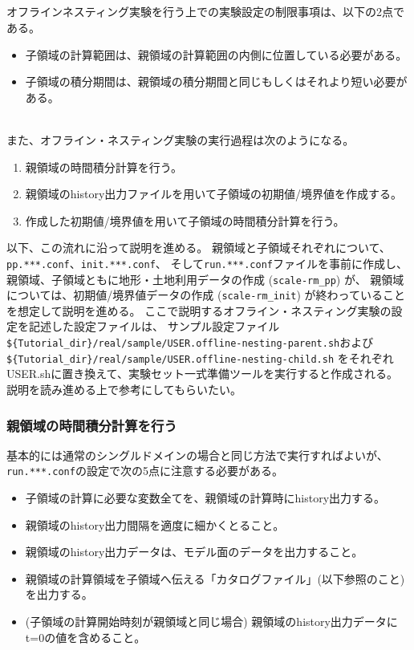 \subsection{\SubsecOflineNesting} \label{subsec:nest_offline}

オフラインネスティング実験を行う上での実験設定の制限事項は、以下の2点である。
\begin{itemize}
 \item 子領域の計算範囲は、親領域の計算範囲の内側に位置している必要がある。
 \item 子領域の積分期間は、親領域の積分期間と同じもしくはそれより短い必要がある。
\end{itemize}

~\\
また、オフライン・ネスティング実験の実行過程は次のようになる。
\begin{enumerate}
 \item 親領域の時間積分計算を行う。
 \item 親領域のhistory出力ファイルを用いて子領域の初期値/境界値を作成する。
 \item 作成した初期値/境界値を用いて子領域の時間積分計算を行う。
\end{enumerate}


以下、この流れに沿って説明を進める。
親領域と子領域それぞれについて、\verb|pp.***.conf|、\verb|init.***.conf|、
そして\verb|run.***.conf|ファイルを事前に作成し、
親領域、子領域ともに地形・土地利用データの作成 (\verb|scale-rm_pp|) が、
親領域については、初期値/境界値データの作成 (\verb|scale-rm_init|) が終わっていることを想定して説明を進める。
ここで説明するオフライン・ネスティング実験の設定を記述した設定ファイルは、
サンプル設定ファイル
\verb|${Tutorial_dir}/real/sample/USER.offline-nesting-parent.sh|および
\verb|${Tutorial_dir}/real/sample/USER.offline-nesting-child.sh|
をそれぞれUSER.shに置き換えて、実験セット一式準備ツールを実行すると作成される。
説明を読み進める上で参考にしてもらいたい。

\subsubsection{親領域の時間積分計算を行う}
基本的には通常のシングルドメインの場合と同じ方法で実行すればよいが、
\verb|run.***.conf|の設定で次の5点に注意する必要がある。

\begin{itemize}
 \item 子領域の計算に必要な変数全てを、親領域の計算時にhistory出力する。
 \item 親領域のhistory出力間隔を適度に細かくとること。
 \item 親領域のhistory出力データは、モデル面のデータを出力すること。
 \item 親領域の計算領域を子領域へ伝える「カタログファイル」(以下参照のこと)を出力する。
 \item (子領域の計算開始時刻が親領域と同じ場合) 親領域のhistory出力データにt=0の値を含めること。
\end{itemize}


